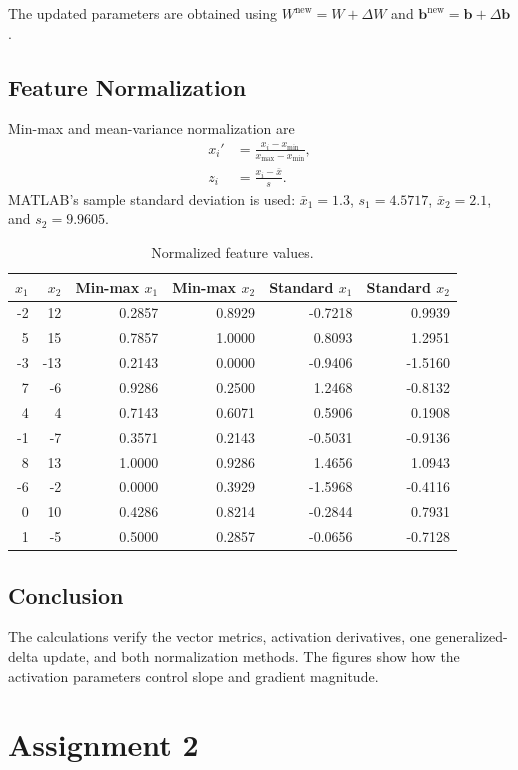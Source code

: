 \documentclass[11pt,a4paper]{article}
\begin{document}
The updated parameters are obtained using $W^{\text{new}}=W+\Delta W$ and $\mathbf{b}^{\text{new}}=\mathbf{b}+\Delta\mathbf{b}$.

\subsection{Feature Normalization}

Min-max and mean-variance normalization are
\begin{align}
    x_i' &= \frac{x_i-x_{\min}}{x_{\max}-x_{\min}},\\
    z_i &= \frac{x_i-\bar{x}}{s}.
\end{align}
MATLAB's sample standard deviation is used: $\bar{x}_1=1.3$, $s_1=4.5717$, $\bar{x}_2=2.1$, and $s_2=9.9605$.

\begin{table}[H]
\centering
\scriptsize
\caption{Normalized feature values.}
\begin{tabular}{rrrrrr}
\toprule
$x_1$ & $x_2$ & Min-max $x_1$ & Min-max $x_2$ & Standard $x_1$ & Standard $x_2$\\
\midrule
-2& 12&0.2857&0.8929&-0.7218& 0.9939\\
 5& 15&0.7857&1.0000& 0.8093& 1.2951\\
-3&-13&0.2143&0.0000&-0.9406&-1.5160\\
 7& -6&0.9286&0.2500& 1.2468&-0.8132\\
 4&  4&0.7143&0.6071& 0.5906& 0.1908\\
-1& -7&0.3571&0.2143&-0.5031&-0.9136\\
 8& 13&1.0000&0.9286& 1.4656& 1.0943\\
-6& -2&0.0000&0.3929&-1.5968&-0.4116\\
 0& 10&0.4286&0.8214&-0.2844& 0.7931\\
 1& -5&0.5000&0.2857&-0.0656&-0.7128\\
\bottomrule
\end{tabular}
\end{table}

\subsection{Conclusion}
The calculations verify the vector metrics, activation derivatives, one generalized-delta update, and both normalization methods. The figures show how the activation parameters control slope and gradient magnitude.

\clearpage
\section{Assignment 2}
\setcounter{table}{0}
\setcounter{figure}{0}
\setcounter{equation}{0}
\end{document}
